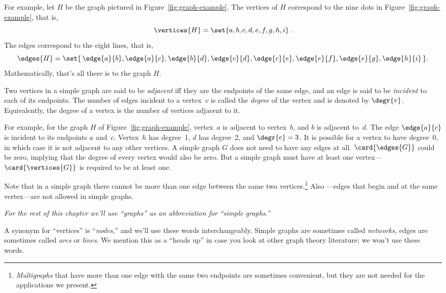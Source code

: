 For example, let $H$ be the graph pictured in
Figure~\ref{fig:graph-example}.  The vertices of $H$ correspond to the
nine dots in Figure~\ref{fig:graph-example}, that is,
\[
\vertices{H} =  \set{a, b, c, d, e, f, g, h, i}\, .
\]
The edges correspond to the eight lines, that is,
\[
\edges{H} =  \set{\, \edge{a}{b}, \edge{a}{c}, \edge{b}{d}, \edge{c}{d},
              \edge{c}{e}, \edge{e}{f}, \edge{e}{g}, \edge{h}{i} \,}.
\]
Mathematically, that's all there is to the graph $H$.

\begin{definition}
Two vertices in a simple graph are said to be \emph{adjacent} iff they
are the endpoints of the same edge, and an edge is said to be
\emph{incident} to each of its endpoints.  The number of edges
incident to a vertex~$v$ is called the \emph{degree}%
of the vertex and
is denoted by $\degr{v}$.  Equivalently, the degree of a vertex is the
number of vertices adjacent to it.
\end{definition}

For example, for the graph $H$ of Figure~\ref{fig:graph-example},
vertex~$a$ is adjacent to vertex~$b$, and $b$ is adjacent to~$d$.  The
edge $\edge{a}{c}$ is incident to its endpoints $a$ and~$c$.
Vertex~$h$ has degree~1, $d$ has degree~2, and $\degr{e} = 3$.  It is
possible for a vertex to have degree~0, in which case it is not
adjacent to any other vertices.  A simple graph $G$ does not need to
have any edges at all. $\card{\edges{G}}$ could be zero, implying that
the degree of every vertex would also be zero.  But a simple graph
must have at least one vertex---$\card{\vertices{G}}$ is
required to be at least one.

Note that in a simple graph there cannot be more than one edge between
the same two vertices.\footnote{ \emph{Multigraphs} that have more
  than one edge with the same two endpoints are sometimes convenient,
  but they are not needed for the applications we present.}  Also
\emph{}---edges that begin and at the same vertex---are
  not allowed in simple graphs.\iffalse
\footnote{You might try to represent a self-loop going between a
  vertex $v$ and itself as $\set{v, v}$, but this equals $\set{v}$.
  It wouldn't be an edge, which is defined to be a set of \emph{two}
  vertices.}\fi 

\emph{For the rest of this chapter we'll use ``graphs'' as an abbreviation
  for ``simple graphs.''}

A synonym for ``vertices'' is ``\emph{nodes},'' and we'll use these
words interchangeably.  Simple graphs are sometimes called
\emph{networks}, edges are sometimes called \emph{arcs} or
\emph{lines}.  We mention this as a ``heads up'' in case you look at
other graph theory literature; we won't use these words.


